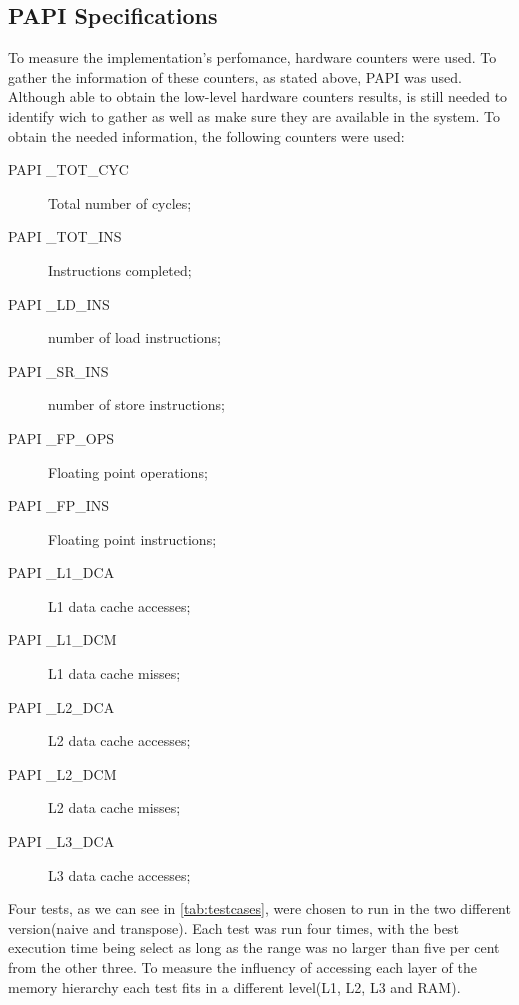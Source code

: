 \documentclass[twoside]{article}
\begin{document}
\begin{multicols}{2}
\subsection{PAPI Specifications}
To measure the implementation's perfomance, hardware counters were used. To gather the information of these counters, as stated above, PAPI was used. Although able to obtain the low-level hardware counters results, is still needed to  identify wich to gather as well as make sure they are available in the system. To obtain the needed information, the following counters were used:
\begin{description}
\item[PAPI \_TOT\_CYC] Total number of cycles;
\item[PAPI \_TOT\_INS] Instructions completed;
\item[PAPI \_LD\_INS] number of load instructions;
\item[PAPI \_SR\_INS] number of store instructions;
\item[PAPI \_FP\_OPS] Floating point operations;
\item[PAPI \_FP\_INS] Floating point instructions;
\item[PAPI \_L1\_DCA] L1 data cache accesses;
\item[PAPI \_L1\_DCM] L1 data cache misses;
\item[PAPI \_L2\_DCA] L2 data cache accesses;
\item[PAPI \_L2\_DCM] L2 data cache misses;
\item[PAPI \_L3\_DCA] L3 data cache accesses;
\end{description}

Four tests, as we can see in \autoref{tab:testcases}, were chosen to run in the two different version(naive and transpose). Each test was run four times, with the best execution time being select as long as the range was no larger than five per cent from the other three. To measure the influency of accessing each layer of the memory hierarchy each test fits in a different level(L1, L2, L3 and RAM).   
\\
\begin{table}[!htp]
\end{table}


\end{multicols}
\end{document}
